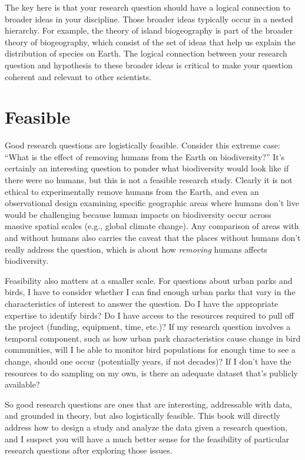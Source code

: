 \documentclass[
]{book}
\begin{document}
The key here is that your research question should have a logical connection to broader ideas in your discipline. Those broader ideas typically occur in a nested hierarchy. For example, the theory of island biogeography is part of the broader theory of biogeography, which consist of the set of ideas that help us explain the distribution of species on Earth. The logical connection between your research question and hypothesis to these broader ideas is critical to make your question coherent and relevant to other scientists.

\section{Feasible}\label{feasible}

Good research questions are logistically feasible. Consider this extreme case: ``What is the effect of removing humans from the Earth on biodiversity?'' It's certainly an interesting question to ponder what biodiversity would look like if there were no humans, but this is not a feasible research study. Clearly it is not ethical to experimentally remove humans from the Earth, and even an observational design examining specific geographic areas where humans don't live would be challenging because human impacts on biodiversity occur across massive spatial scales (e.g., global climate change). Any comparison of areas with and without humans also carries the caveat that the places without humans don't really address the question, which is about how \emph{removing} humans affects biodiversity.

Feasibility also matters at a smaller scale. For questions about urban parks and birds, I have to consider whether I can find enough urban parks that vary in the characteristics of interest to answer the question. Do I have the appropriate expertise to identify birds? Do I have access to the resources required to pull off the project (funding, equipment, time, etc.)? If my research question involves a temporal component, such as how urban park characteristics cause change in bird communities, will I be able to monitor bird populations for enough time to see a change, should one occur (potentially years, if not decades)? If I don't have the resources to do sampling on my own, is there an adequate dataset that's publicly available?

So good research questions are ones that are interesting, addressable with data, and grounded in theory, but also logistically feasible. This book will directly address how to design a study and analyze the data given a research question, and I suspect you will have a much better sense for the feasibility of particular research questions after exploring those issues.
\end{document}
